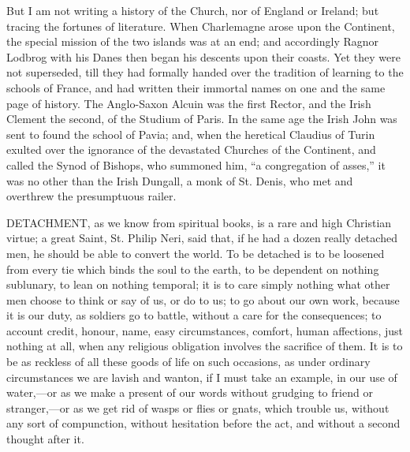 But I am not writing a history of the Church, nor of England or
Ireland; but tracing the fortunes of literature. When Charlemagne
arose upon the Continent, the special mission of the two islands was
at an end; and accordingly Ragnor Lodbrog with his Danes then began
his descents upon their coasts. Yet they were not superseded, till
they had formally handed over the tradition of learning to the schools
of France, and had written their immortal names on one and the same
page of history. The Anglo-Saxon Alcuin was the first Rector, and the
Irish Clement the second, of the Studium of Paris. In the same age the
Irish John was sent to found the school of Pavia; and, when the
heretical Claudius of Turin exulted over the ignorance of the
devastated Churches of the Continent, and called the Synod of Bishops,
who summoned him, ``a congregation of asses,'' it was no other
than the Irish Dungall, a monk of St. Denis, who met and overthrew the
presumptuous railer.


DETACHMENT, as we know from spiritual
books, is a rare and high Christian virtue; a great Saint, St. Philip
Neri, said that, if he had a dozen really detached men, he should be
able to convert the world. To be detached is to be loosened from every
tie which binds the soul to the earth, to be dependent on nothing
sublunary, to lean on nothing temporal; it is to care simply nothing
what other men choose to think or say of us, or do to us; to go about
our own work, because it is our duty, as soldiers go to battle,
without a care for the consequences; to account credit, honour, name,
easy circumstances, comfort, human affections, just nothing at all,
when any religious obligation involves the sacrifice of them. It is to
be as reckless of all these goods of life on such occasions, as under
ordinary circumstances we are lavish and wanton, if I must take an
example, in our use of water,—or as we make a present of our words
without grudging to friend or stranger,—or as we get rid of wasps or
flies or gnats, which trouble us, without any sort of compunction,
without hesitation before the act, and without a second thought after
it.

